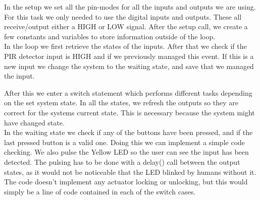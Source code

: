 In the setup we set all the pin-modes for all the inputs and outputs we are using. For this task we only needed to use the digital inputs and outputs. These all receive/output either a HIGH or LOW signal. After the setup call, we create a few constants and variables to store information outside of the loop.\\

In the loop we first retrieve the states of the inputs. After that we check if the PIR detector input is HIGH and if we previously managed this event. If this is a new input we change the system to the waiting state, and save that we managed the input. 

After this we enter a switch statement which performs different tasks depending on the set system state. In all the states, we refresh the outputs so they are correct for the systems current state. This is necessary because the system might have changed state. \\

In the waiting state we check if any of the buttons have been pressed, and if the last pressed button is a valid one. Doing this we can implement a simple code checking. We also pulse the Yellow LED so the user can see the input has been detected. The pulsing has to be done with a delay() call between the output states, as it would not be noticeable that the LED blinked by humans without it.\\

The code doesn't implement any actuator locking or unlocking, but this would simply be a line of code contained in each of the  switch cases. 
\pagebreak